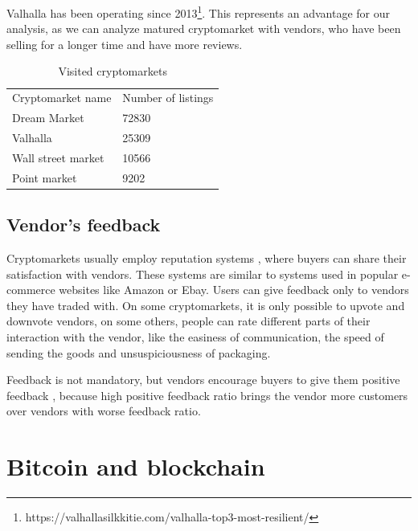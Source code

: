 \documentclass[
  digital, %
  table,   %
  lof,     %
  lot,     %
  oneside
]{fithesis3}
\begin{document}
Valhalla has been operating since 2013\footnote{https://valhallasilkkitie.com/valhalla-top3-most-resilient/}.
This represents an advantage for our analysis, as we can analyze matured cryptomarket with vendors,
who have been selling for a longer time and have more reviews.

\begin{table}
    \caption{Visited cryptomarkets}
    \label{cryptomarkets}
    \begin{tabular}{|l|l|}
    Cryptomarket name & Number of listings\\
    Dream Market & 72830 \\
    Valhalla     & 25309 \\
    Wall street market   & 10566 \\
    Point market  & 9202 \\
    \end{tabular}
\end{table}

\subsection{Vendor's feedback}

Cryptomarkets usually employ reputation systems \cite{resnick2000reputation},
where buyers can share their satisfaction with vendors.
These systems are similar to systems used in popular e-commerce websites like Amazon or Ebay.
Users can give feedback only to vendors they have traded with.
On some cryptomarkets, it is only possible to upvote and downvote vendors,
on some others, people can rate different parts of their interaction with the vendor,
like the easiness of communication,
the speed of sending the goods and unsuspiciousness of packaging.

Feedback is not mandatory, but vendors encourage buyers to give them positive feedback
\cite{aldridge2014not}\cite{soska2015measuring}, because high positive feedback
ratio brings the vendor more customers over vendors with worse feedback ratio.

\section{Bitcoin and blockchain}
\end{document}

